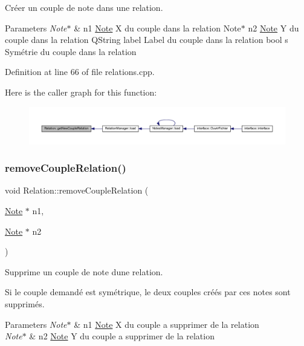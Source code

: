 Créer un couple de note dans une relation. 


\begin{DoxyParams}{Parameters}
{\em Note$\ast$} & n1 \hyperlink{class_note}{Note} X du couple dans la relation Note$\ast$ n2 \hyperlink{class_note}{Note} Y du couple dans la relation Q\+String label Label du couple dans la relation bool s Symétrie du couple dans la relation \\
\hline
\end{DoxyParams}


Definition at line 66 of file relations.\+cpp.

Here is the caller graph for this function\+:\nopagebreak
\begin{figure}[H]
\begin{center}
\leavevmode
\includegraphics[width=350pt]{class_relation_a69211cc18aed20c1df97c4b73317a2e1_icgraph}
\end{center}
\end{figure}
\mbox{\label{class_relation_ab81e16d688dcb4703e8ab299fef80c10}} 
\subsubsection{\texorpdfstring{remove\+Couple\+Relation()}{removeCoupleRelation()}}
{\footnotesize\ttfamily void Relation\+::remove\+Couple\+Relation (\begin{DoxyParamCaption}\item[{\hyperlink{class_note}{Note} $\ast$}]{n1,  }\item[{\hyperlink{class_note}{Note} $\ast$}]{n2 }\end{DoxyParamCaption})}



Supprime un couple de note d\textquotesingle{}une relation. 

Si le couple demandé est symétrique, le deux couples créés par ces notes sont supprimés. 
\begin{DoxyParams}{Parameters}
{\em Note$\ast$} & n1 \hyperlink{class_note}{Note} X du couple a supprimer de la relation \\
\hline
{\em Note$\ast$} & n2 \hyperlink{class_note}{Note} Y du couple a supprimer de la relation \\
\hline
\end{DoxyParams}


